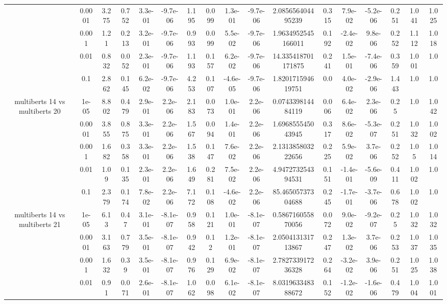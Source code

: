 \begin{tabular}{|c|c|c|c|c|c|c|c|c|c|c|c|c|c|c|c|c|}
 & 0.0001 & 3.275 & 0.752 & 3.3e-01 & -9.7e-06 & 1.195 & 0.099 & 1.3e-01 & -9.7e-06 & 2.085656404495239 & 0.315 & 7.9e-02 & -5.2e-06 & 0.251 & 1.041 & 1.025 \\
 & 0.001 & 1.21 & 0.213 & 3.2e-01 & -9.7e-06 & 0.993 & 0.099 & 5.5e-02 & -9.7e-06 & 1.9634952545166011 & 0.192 & -2.4e-02 & 9.8e-06 & 0.252 & 1.112 & 1.018 \\
 & 0.01 & 0.832 & 0.052 & 2.3e-01 & -9.7e-06 & 1.193 & 0.157 & 6.2e-02 & -9.7e-06 & 14.335418701171875 & 0.241 & 1.5e-01 & -7.4e-06 & 0.359 & 1.001 & 1.0 \\
 & 0.1 & 2.862 & 0.145 & 6.2e-02 & -9.7e-06 & 4.253 & 0.107 & -4.6e-05 & -9.7e-06 & 1.820171594619751 & 0.0 & 4.0e-02 & -2.9e-06 & 1.443 & 1.0 & 1.0 \\
\hline
\multirow{5}{*}{multiberts 14 vs multiberts 20} & 1e-05 & 8.802 & 0.479 & 2.9e-01 & 2.2e-06 & 2.183 & 0.073 & 1.0e-01 & 2.2e-06 & 0.074339814484119 & 0.006 & 6.4e-02 & 2.3e-06 & 0.25 & 1.0 & 1.042 \\
 & 0.0001 & 3.855 & 0.875 & 3.3e-01 & 2.2e-06 & 1.567 & 0.094 & 1.4e-01 & 2.2e-06 & 1.696855545043945 & 0.317 & 8.6e-02 & -5.3e-07 & 0.251 & 1.032 & 1.002 \\
 & 0.001 & 1.682 & 0.358 & 3.3e-01 & 2.2e-06 & 1.538 & 0.147 & 7.6e-02 & 2.2e-06 & 2.131385803222656 & 0.225 & 5.9e-02 & 3.7e-06 & 0.252 & 1.05 & 1.014 \\
 & 0.01 & 1.09 & 0.135 & 2.3e-01 & 2.2e-06 & 1.649 & 0.281 & 7.5e-02 & 2.2e-06 & 4.947273254394531 & 0.151 & -1.4e-01 & -5.6e-09 & 0.411 & 1.002 & 1.0 \\
 & 0.1 & 2.379 & 0.174 & 7.8e-02 & 2.2e-06 & 7.172 & 0.108 & -4.6e-02 & 2.2e-06 & 85.46505737304688 & 0.245 & -1.7e-01 & -3.7e-06 & 0.678 & 1.002 & 1.0 \\
\hline
\multirow{5}{*}{multiberts 14 vs multiberts 21} & 1e-05 & 6.13 & 0.47 & 3.1e-01 & -8.1e-07 & 0.958 & 0.121 & 1.0e-01 & -8.1e-07 & 0.586716055870056 & 0.072 & 9.0e-02 & -9.2e-07 & 0.25 & 1.032 & 1.032 \\
 & 0.0001 & 3.163 & 0.779 & 3.5e-01 & -8.1e-07 & 0.942 & 0.12 & 1.2e-01 & -8.1e-07 & 2.050413131713867 & 0.247 & 1.3e-02 & 3.7e-06 & 0.253 & 1.037 & 1.035 \\
 & 0.001 & 1.632 & 0.39 & 3.5e-01 & -8.1e-07 & 0.976 & 0.129 & 6.9e-02 & -8.1e-07 & 2.782733917236328 & 0.264 & -3.2e-02 & 3.9e-06 & 0.251 & 1.025 & 1.038 \\
 & 0.01 & 0.91 & 0.071 & 2.6e-01 & -8.1e-07 & 1.062 & 0.098 & 6.1e-02 & -8.1e-07 & 8.031963348388672 & 0.152 & -1.2e-02 & -1.6e-06 & 0.479 & 1.004 & 1.001 \\

\end{tabular}

